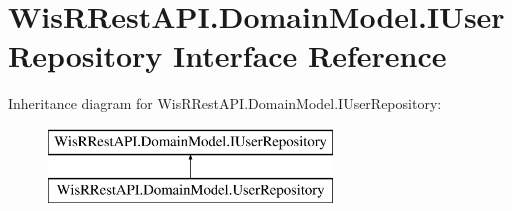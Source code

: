 \hypertarget{interface_wis_r_rest_a_p_i_1_1_domain_model_1_1_i_user_repository}{}\section{Wis\+R\+Rest\+A\+P\+I.\+Domain\+Model.\+I\+User\+Repository Interface Reference}
\label{interface_wis_r_rest_a_p_i_1_1_domain_model_1_1_i_user_repository}
Inheritance diagram for Wis\+R\+Rest\+A\+P\+I.\+Domain\+Model.\+I\+User\+Repository\+:\begin{figure}[H]
\begin{center}
\leavevmode
\includegraphics[height=2.000000cm]{interface_wis_r_rest_a_p_i_1_1_domain_model_1_1_i_user_repository}
\end{center}
\end{figure}
